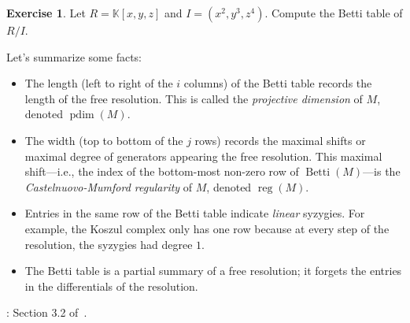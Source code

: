 \documentclass[12pt,a4paper]{article}
\newcommand{\KK}{\mathbb{K}}
\DeclareMathOperator{\Betti}{Betti}
\DeclareMathOperator{\pdim}{pdim}
\DeclareMathOperator{\reg}{reg}
\theoremstyle{definition}
\newtheorem{exercise}[theorem]{Exercise}
\numberwithin{equation}{section}
\begin{document}
\begin{exercise}
    Let $R = \KK[x,y,z]$ and $I = (x^2, y^3, z^4)$.
    Compute the Betti table of $R/I$.
\end{exercise}

Let's summarize some facts:
\begin{itemize}
    \item The length (left to right of the $i$ columns) of the Betti table records the length of the free resolution. 
    This is called the \emph{projective dimension} of $M$, denoted $\pdim(M)$.

    \item The width (top to bottom of the $j$ rows) records the maximal shifts or maximal degree of generators appearing the free resolution.
    This maximal shift---i.e., the index of the bottom-most non-zero row of $\Betti(M)$---is the \emph{Castelnuovo-Mumford regularity} of $M$, denoted $\reg(M)$.

    \item Entries in the same row of the Betti table indicate \emph{linear} syzygies.
    For example, the Koszul complex only has one row because at every step of the resolution, the syzygies had degree $1$.

    \item The Betti table is a partial summary of a free resolution; it forgets the entries in the differentials of the resolution.
\end{itemize}

\vspace*{1cm}

: Section 3.2 of~\cite{schenck_computational_2003}.
\end{document}
